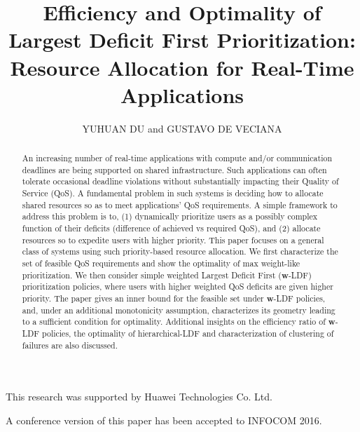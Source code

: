 \documentclass[prodmode,acmtompecs]{acmsmall}
\newcommand{\add}[1]{#1}
\begin{document}

\title{Efficiency and Optimality of Largest Deficit First Prioritization: Resource Allocation for Real-Time Applications}
\author{YUHUAN DU and GUSTAVO DE VECIANA
}

\begin{abstract}
An increasing number of real-time applications with compute and/or communication deadlines
are being supported on shared infrastructure.  Such applications can often tolerate 
occasional deadline violations without substantially impacting their Quality of Service (QoS).
A fundamental problem in such systems is deciding how
to allocate shared resources so as to meet applications' QoS requirements.
A simple framework to address this problem is to, (1) dynamically prioritize users as a possibly complex function of their deficits (difference of achieved vs required QoS), and (2) allocate resources so to expedite users with higher priority.
This paper focuses on a general class of systems using such priority-based resource allocation.
We first characterize the set of feasible QoS requirements and show the optimality of max weight-like prioritization.
We then consider simple weighted Largest Deficit First ($\mathbf{w}$-LDF)
prioritization policies, where users with higher weighted QoS deficits are given higher priority.
The paper gives an inner bound for the feasible set under $\mathbf{w}$-LDF policies, and,
under an additional monotonicity assumption, characterizes its geometry leading to a sufficient condition for optimality.
Additional insights on the efficiency ratio of $\mathbf{w}$-LDF policies, the 
optimality of hierarchical-LDF and characterization of clustering of failures are also discussed.
\end{abstract}


\begin{bottomstuff}
\add{
This research was supported by Huawei Technologies Co. Ltd.}

\add{A conference version of this paper has been accepted to INFOCOM 2016. 
}
\end{bottomstuff}

\maketitle
\end{document}
